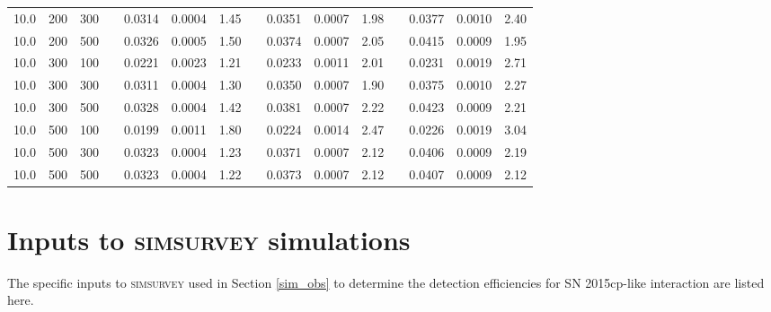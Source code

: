 \documentclass[a4paper,oneside,12pt, class=Latex/Classes/PhDthesisPSnPDF, crop=false]{standalone}
\begin{document}
\begin{table}
{\begin{tabular}{cccclcrclcrclcr}
  10.0 & 200 & 300 && 0.0314 & 0.0004 & 1.45 && 0.0351 & 0.0007 & 1.98 && 0.0377 & 0.0010 & 2.40\\
  10.0 & 200 & 500 && 0.0326 & 0.0005 & 1.50 && 0.0374 & 0.0007 & 2.05 && 0.0415 & 0.0009 & 1.95\\
  10.0 & 300 & 100 && 0.0221 & 0.0023 & 1.21 && 0.0233 & 0.0011 & 2.01 && 0.0231 & 0.0019 & 2.71\\
  10.0 & 300 & 300 && 0.0311 & 0.0004 & 1.30 && 0.0350 & 0.0007 & 1.90 && 0.0375 & 0.0010 & 2.27\\
  10.0 & 300 & 500 && 0.0328 & 0.0004 & 1.42 && 0.0381 & 0.0007 & 2.22 && 0.0423 & 0.0009 & 2.21\\
  10.0 & 500 & 100 && 0.0199 & 0.0011 & 1.80 && 0.0224 & 0.0014 & 2.47 && 0.0226 & 0.0019 & 3.04\\
  10.0 & 500 & 300 && 0.0323 & 0.0004 & 1.23 && 0.0371 & 0.0007 & 2.12 && 0.0406 & 0.0009 & 2.19\\
  10.0 & 500 & 500 && 0.0323 & 0.0004 & 1.22 && 0.0373 & 0.0007 & 2.12 && 0.0407 & 0.0009 & 2.12\\
  \hline
 \end{tabular}
 }
 \label{sim_z50_results}
\end{table}

\section{Inputs to \textsc{simsurvey} simulations}
\label{sec:simsurvey_inputs}

The specific inputs to \textsc{simsurvey} used in Section \ref{sim_obs} to determine the detection efficiencies for SN 2015cp-like interaction are listed here. 
\end{document}
